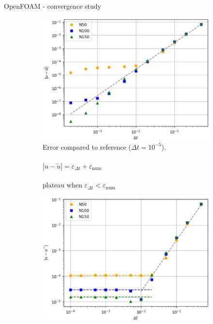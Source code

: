 \documentclass[
  english,            %
  aspectratio=43,    %
]{tumbeamer}
\begin{document}
\begin{frame}{OpenFOAM - convergence study}
\vspace{15pt}
\begin{figure}[!htbp]
    \centering
    \begin{subfigure}[b]{0.49\textwidth}
      \includegraphics[width=\textwidth]{resources/ref_error_openfoam.png}
      \caption{
        Error compared to reference ($\Delta t = 10^{-5}$). \\ \\
        $|u - \tilde{u}| = \varepsilon_{\Delta t} + \varepsilon_\text{num}$ \\ \\
        plateau when $\varepsilon_{\Delta t} < \varepsilon_\text{num}$
      }
      \label{fig:convergence_openfoam}
    \end{subfigure}
    \hspace{1pt}
    \begin{subfigure}[b]{0.49\textwidth}
        \includegraphics[width=\textwidth]{resources/analytic_error_openfoam.png}

\end{subfigure}
\end{figure}
\end{frame}
\end{document}
